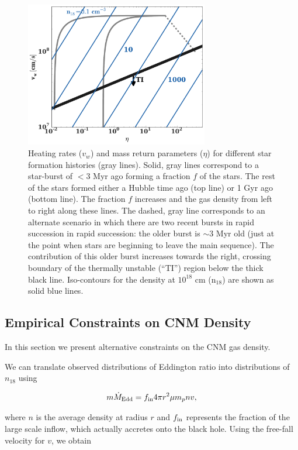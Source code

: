 \documentclass[usenatbib,fleqn]{mnras}
\begin{document}
\begin{figure} 
  \includegraphics[width=8cm]{cnm_plot.pdf}
  \caption{\label{fig:param} Heating rates ($v_w$) and mass return
    parameters ($\eta$) for different star formation histories (gray
    lines). Solid, gray lines correspond to a star-burst of $<3$ Myr
    ago forming a fraction $f$ of the stars. The rest of the stars
    formed either a Hubble time ago (top line) or 1 Gyr ago (bottom
    line). The fraction $f$ increases and the gas density from left to
    right along these lines. The dashed, gray line corresponds to an
    alternate scenario in which there are two recent bursts in rapid
    succession in rapid succession: the older burst is $\sim 3$ Myr
    old (just at the point when stars are beginning to leave the main
    sequence). The contribution of this older burst increases towards
    the right, crossing boundary of the thermally unstable (``TI'')
    region below the thick black line. Iso-contours for the density at
    $10^{18}$ cm ($\mathrm{n_{18}}$) are shown as solid blue lines.} 
\end{figure}


\subsection{Empirical Constraints on CNM Density}
In this section we present alternative constraints on the CNM gas
density.  

We can translate observed distributions of Eddington ratio into 
distributions of $n_{18}$ using

\begin{equation}
m \dot{M}_{\rm Edd}= f_{\rm in} 4 \pi r^2 \mu m_p n v,
\label{eq:mdot}
\end{equation}

where $n$ is the average density at radius $r$ and $f_{\rm in}$
represents the fraction of the large scale inflow, which actually
accretes onto the black hole.  Using the free-fall velocity for
$v$, we obtain
\end{document}

